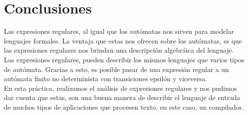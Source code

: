 \section{Conclusiones}

Las expresiones regulares, al igual que los autómatas nos sirven para modelar lenguajes formales. La ventaja que estas nos ofrecen sobre los autómatas, es que las expresiones regulares nos brindan una descripción algebráica del lenguaje. \\

Las expresiones regulares, pueden describir los mismos lenguajes que varios tipos de autómata. Gracias a esto, es posible pasar de una expresión regular a un autómata finito no determinista con transiciones epsilón y viceversa. \\

En esta práctica, realizamos el análisis de expresiones regulares y nos pudimos dar cuenta que estas, son una buena manera de describir el lenguaje de entrada de muchos tipos de aplicaciones que procesen texto, en este caso, un compilador.





